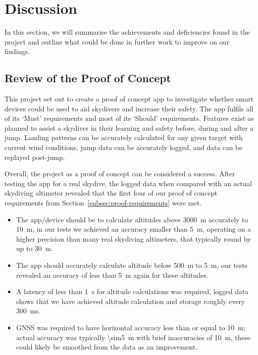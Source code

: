\section{Discussion}\label{sec:discussion}
In this section, we will summarise the achievements and deficiencies found in the project and outline what could be done in further work to improve on our findings.


\subsection{Review of the Proof of Concept}
This project set out to create a proof of concept app to investigate whether smart devices could be used to aid skydivers and increase their safety.
The app fulfils all of its `Must' requirements and most of its `Should' requirements.
Features exist as planned to assist a skydiver in their learning and safety before, during and after a jump. Landing patterns can be accurately calculated for any given target with current wind conditions, jump data can be accurately logged, and data can be replayed post-jump.

Overall, the project as a proof of concept can be considered a success. After testing the app for a real skydive, the logged data when compared with an actual skydiving altimeter revealed that the first four of our proof of concept requirements from Section~\ref{subsec:proof-requirements} were met.

\begin{itemize}
  \item The app/device should be to calculate altitudes above \SI{3000}{\metre} accurately to \SI{10}{\metre}, in our tests we achieved an accuracy smaller than \SI{5}{\metre}, operating on a higher precision than many real skydiving altimeters, that typically round by up to \SI{30}{\metre}.

  \item The app should accurately calculate altitude below \SI{500}{\metre} to \SI{5}{\metre}, our tests revealed an accuracy of less than \SI{5}{\metre} again for these altitudes.

\item A latency of less than \SI{1}{\second} for altitude calculations was required, logged data shows that we have achieved altitude calculation and storage roughly every \SI{300}{\milli\second}.

\item GNSS was required to have horizontal accuracy less than or equal to \SI{10}{\metre}; actual accuracy was typically \SI{\sim5}{\metre} with brief inaccuracies of \SI{10}{\metre}, these could likely be smoothed from the data as an improvement.
\end{itemize}

